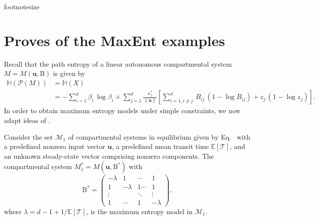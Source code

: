 \documentclass[smallextended]{svjour3}
\makeatletter
\renewcommand*{\eqref}[1]{%
  \hyperref[{#1}]{\textup{\tagform@{\ref*{#1}}}}%
}
\renewcommand{\tens}[1]{\mathrm{#1}}
\renewcommand{\vec}[1]{\mathbf{#1}}
\newcommand{\E}{\mathbb{E}}
\newcommand{\TT}{\mathcal{T}}
\renewcommand{\H}{\mathbb{H}}
\newcommand{\suml}{\sum\limits}
\newcommand{\vnorms}[1]{\|#1\|}
\makeatother
\begin{document}
% 

{footnotesize
}


\appendix


\section{Proves of the MaxEnt examples}
	Recall that the path entropy of a linear autonomous compartmental system $M=M(\vec{u},\tens{B})$ is given by
	\begin{equation}
    \begin{aligned}
      \H(\mathcal{P}(M)) &= \H(X)\\
      &= -\suml_{i=1}^d\beta_i\,\log\beta_i + \suml_{j=1}^d \frac{x^\ast_j}{\vnorms{\vec{u}}}\left[\suml_{i=1,i\neq j}^d \,B_{ij}\,(1-\log B_{ij}) + z_j\,(1-\log z_j)\right].
    \end{aligned}
	\end{equation}
	In order to obtain maximum entropy models under simple constraints, we now adapt ideas of \cite{Girardin2004MCAP}.

	\begin{myproposition}
    \label{proposition:max_ent_example_1}
		Consider the set $\mathcal{M}_1$ of compartmental systems in equilibrium given by Eq.~\eqref{eqn:lin_CS_sys} with a predefined nonzero input vector $\vec{u}$, a predefined mean transit time $\E\left[\TT\right]$, and an unknown steady-state vector comprising nonzero components.
		The compartmental system $M^\ast_1=M(\vec{u},\tens{B}^\ast)$ with 
		\begin{equation}
			\tens{B}^\ast = \begin{pmatrix}
									-\lambda & 1 & \cdots & 1\\
									1 & -\lambda & 1 \cdots & 1 \\
									\vdots & & \ddots & \vdots\\
									1 & \cdots & 1 & -\lambda
             \end{pmatrix},
		\end{equation}
		where $\lambda=d-1+1/\E\left[\TT\right]$, 		
		is the maximum entropy model in $\mathcal{M}_1$.
	\end{myproposition}
\end{document}
